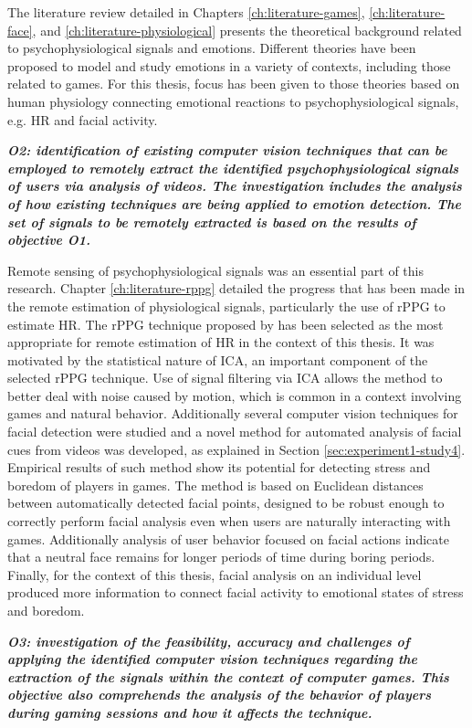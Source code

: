 The literature review detailed in Chapters \ref{ch:literature-games}, \ref{ch:literature-face}, and \ref{ch:literature-physiological} presents the theoretical background related to psychophysiological signals and emotions. Different theories have been proposed to model and study emotions in a variety of contexts, including those related to games. For this thesis, focus has been given to those theories based on human physiology connecting emotional reactions to psychophysiological signals, e.g. HR and facial activity.

\textit{\textbf{O2: identification of existing computer vision techniques that can be employed to remotely extract the identified psychophysiological signals of users via analysis of videos. The investigation includes the analysis of how existing techniques are being applied to emotion detection. The set of signals to be remotely extracted is based on the results of objective \textbf{O1}.}}

Remote sensing of psychophysiological signals was an essential part of this research. Chapter \ref{ch:literature-rppg} detailed the progress that has been made in the remote estimation of physiological signals, particularly the use of rPPG to estimate HR. The rPPG technique proposed by \textcite{poh2011advancements} has been selected as the most appropriate for remote estimation of HR in the context of this thesis. It was motivated by the statistical nature of ICA, an important component of the selected rPPG technique. Use of signal filtering via ICA allows the method to better deal with noise caused by motion, which is common in a context involving games and natural behavior. Additionally several computer vision techniques for facial detection were studied and a novel method for automated analysis of facial cues from videos was developed, as explained in Section \ref{sec:experiment1-study4}. Empirical results of such method show its potential for detecting stress and boredom of players in games. The method is based on Euclidean distances between automatically detected facial points, designed to be robust enough to correctly perform facial analysis even when users are naturally interacting with games. Additionally analysis of user behavior focused on facial actions indicate that a neutral face remains for longer periods of time during boring periods. Finally, for the context of this thesis, facial analysis on an individual level produced more information to connect facial activity to emotional states of stress and boredom.

\textit{\textbf{O3: investigation of the feasibility, accuracy and challenges of applying the identified computer vision techniques regarding the extraction of the signals within the context of computer games. This objective also comprehends the analysis of the behavior of players during gaming sessions and how it affects the technique.}}

